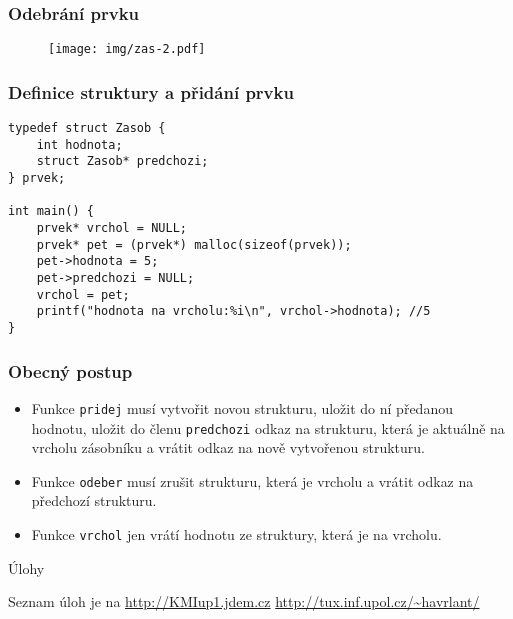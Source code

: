 \documentclass{beamer}
\newenvironment{itemizex}%
  {\large \begin{itemize}%
    \setlength{\itemsep}{8pt}%
    \setlength{\parskip}{8pt}}%
  {\end{itemize}}
\begin{document}
\begin{frame}[t,fragile]\frametitle{Odebrání prvku} 
\begin{figure}[htb]
    \centering
    \texttt{[image: img/zas-2.pdf]}
\end{figure}
\end{frame}


\begin{frame}[t,fragile]\frametitle{Definice struktury a přidání prvku} 
\begin{verbatim} 
typedef struct Zasob {
    int hodnota;
    struct Zasob* predchozi;
} prvek;

int main() {
    prvek* vrchol = NULL;
    prvek* pet = (prvek*) malloc(sizeof(prvek));
    pet->hodnota = 5;
    pet->predchozi = NULL;
    vrchol = pet;
    printf("hodnota na vrcholu:%i\n", vrchol->hodnota); //5
}
\end{verbatim}
\end{frame}


\begin{frame}[t,fragile]\frametitle{Obecný postup} 
    \begin{itemizex}
        \item Funkce \texttt{pridej} musí vytvořit novou strukturu, uložit do ní předanou hodnotu, uložit do členu \texttt{predchozi} odkaz na strukturu, která je aktuálně na vrcholu zásobníku a vrátit odkaz na nově vytvořenou strukturu.
        \item Funkce \texttt{odeber} musí zrušit strukturu, která je vrcholu a vrátit odkaz na předchozí strukturu.
        \item Funkce \texttt{vrchol} jen vrátí hodnotu ze struktury, která je na vrcholu.
    \end{itemizex}
\end{frame}


\begin{frame}[t,fragile]{Úlohy}
\begin{center}
\vskip 1cm
{\Large Seznam úloh je na \url{http://KMIup1.jdem.cz}}
\vskip 2cm
\url{http://tux.inf.upol.cz/~havrlant/}
\end{center}
\end{frame}
\end{document}
